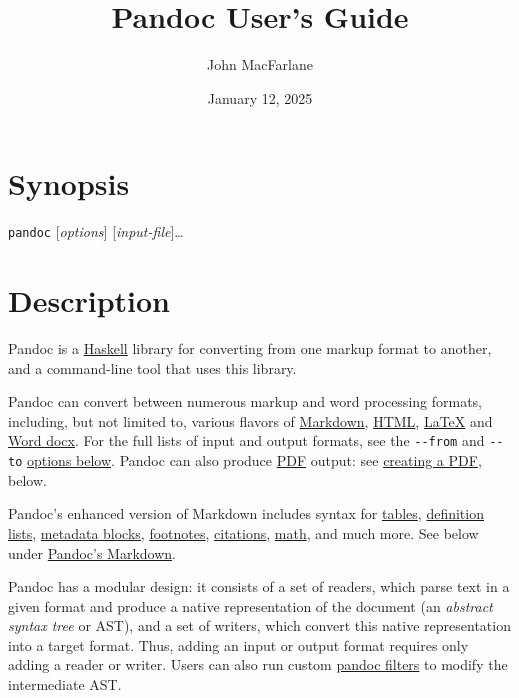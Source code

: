 \documentclass[
  b5paper
]{book}
\title{Pandoc User's Guide}
\author{John MacFarlane}
\date{January 12, 2025}
\begin{document}
\setlength{\RaggedRightParindent}{1em}
\RaggedRight
{}

\maketitle

\tableofcontents

\chapter{Synopsis}\label{synopsis}

\texttt{pandoc} {[}\emph{options}{]} {[}\emph{input-file}{]}\ldots{}

\chapter{Description}\label{description}

Pandoc is a \href{https://www.haskell.org}{Haskell} library for
converting from one markup format to another, and a command-line tool
that uses this library.

Pandoc can convert between numerous markup and word processing formats,
including, but not limited to, various flavors of
\href{https://daringfireball.net/projects/markdown/}{Markdown},
\href{https://www.w3.org/html/}{HTML},
\href{https://www.latex-project.org/}{LaTeX} and
\href{https://en.wikipedia.org/wiki/Office_Open_XML}{Word docx}. For the
full lists of input and output formats, see the \texttt{-\/-from} and
\texttt{-\/-to} \hyperref[general-options]{options below}. Pandoc can
also produce \href{https://www.adobe.com/pdf/}{PDF} output: see
\hyperref[creating-a-pdf]{creating a PDF}, below.

Pandoc's enhanced version of Markdown includes syntax for
\hyperref[tables]{tables}, \hyperref[definition-lists]{definition
lists}, \hyperref[metadata-blocks]{metadata blocks},
\hyperref[footnotes]{footnotes}, \hyperref[citations]{citations},
\hyperref[math]{math}, and much more. See below under
\hyperref[pandocs-markdown]{Pandoc's Markdown}.

Pandoc has a modular design: it consists of a set of readers, which
parse text in a given format and produce a native representation of the
document (an \emph{abstract syntax tree} or AST), and a set of writers,
which convert this native representation into a target format. Thus,
adding an input or output format requires only adding a reader or
writer. Users can also run custom
\href{https://pandoc.org/filters.html}{pandoc filters} to modify the
intermediate AST.
\end{document}
